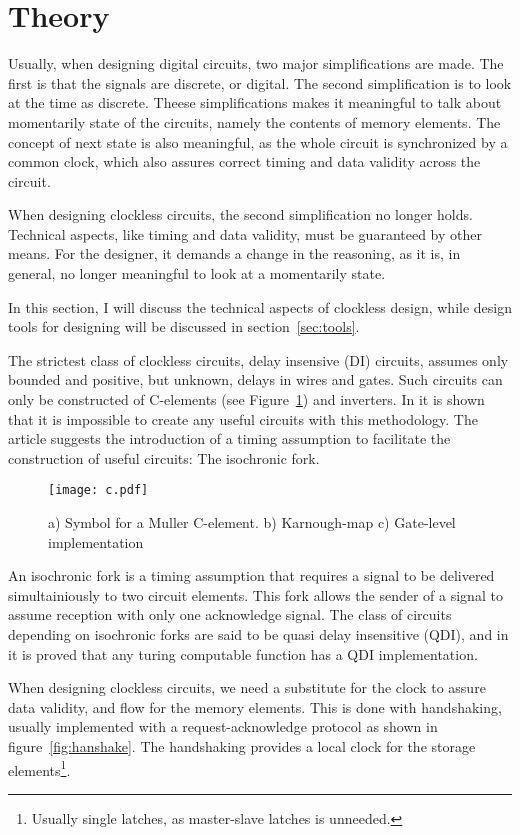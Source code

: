 \section{Theory}

Usually, when designing digital circuits, two major simplifications
are made. The first is that the signals are discrete, or digital. The
second simplification is to look at the time as discrete. Theese
simplifications makes it meaningful to talk about momentarily state of
the circuits, namely the contents of memory elements. The concept of
next state is also meaningful, as the whole circuit is synchronized by
a common clock, which also assures correct timing and data validity
across the circuit.

When designing clockless circuits, the second simplification no longer
holds. Technical aspects, like timing and data validity, must be
guaranteed by other means. For the designer, it demands a change in
the reasoning, as it is, in general, no longer meaningful to look at a
momentarily state.

In this section, I will discuss the technical aspects of clockless
design, while design tools for designing will be discussed in
section~\ref{sec:tools}.

The strictest class of clockless circuits, delay insensive (DI)
circuits, assumes only bounded and positive, but unknown, delays in
wires and gates. Such circuits can only be constructed of C-elements
(see Figure~\ref{fig:c}) and inverters. In \cite{dilimit} it is shown
that it is impossible to create any useful circuits with this
methodology. The article suggests the introduction of a timing
assumption to facilitate the construction of useful circuits: The
isochronic fork.

\begin{figure}[htbp]
  \centering
  \texttt{[image: c.pdf]}
  \caption{a) Symbol for a Muller C-element. b) Karnough-map c)
    Gate-level implementation}
  \label{fig:c}
\end{figure}

An isochronic fork is a timing assumption that requires a signal to be
delivered simultainiously to two circuit elements. This fork allows
the sender of a signal to assume reception with only one acknowledge
signal. The class of circuits depending on isochronic forks are said
to be quasi delay insensitive (QDI), and in \cite{turing} it is proved
that any turing computable function has a QDI implementation.

When designing clockless circuits, we need a substitute for the clock
to assure data validity, and flow for the memory elements. This is
done with handshaking, usually implemented with a request-acknowledge
protocol as shown in figure~\ref{fig:hanshake}. The handshaking
provides a local clock for the storage elements\footnote{Usually
  single latches, as master-slave latches is unneeded.}.

